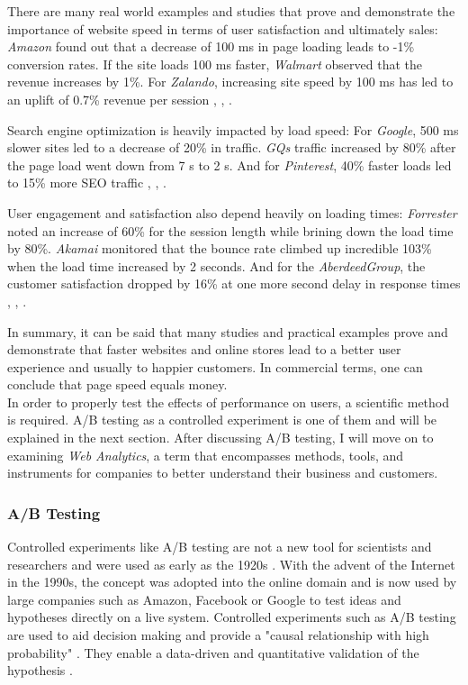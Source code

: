 There are many real world examples and studies that prove and demonstrate the importance of website speed in terms of user satisfaction and ultimately sales:
\textit{Amazon} found out that a decrease of 100 ms in page loading leads to -1\% conversion rates.
If the site loads 100 ms faster, \textit{Walmart} observed that the revenue increases by 1\%.
For \textit{Zalando}, increasing site speed by 100 ms has led to an uplift of 0.7\% revenue per session \cite{2006Linden}, \cite{2018Zalando}, \cite{2012Walmart}.


Search engine optimization is heavily impacted by load speed:
For \textit{Google}, 500 ms slower sites led to a decrease of 20\% in traffic.
\textit{GQs} traffic increased by 80\% after the page load went down from 7 s to 2 s.
And for \textit{Pinterest}, 40\% faster loads led to 15\% more SEO traffic \cite{2015GQ}, \cite{2006Mayer}, \cite{2017Pinterest}.


User engagement and satisfaction also depend heavily on loading times:
\textit{Forrester} noted an increase of 60\% for the session length while brining down the load time by 80\%.
\textit{Akamai} monitored that the bounce rate climbed up incredible 103\% when the load time increased by 2 seconds.
And for the \textit{AberdeedGroup}, the customer satisfaction dropped by 16\% at one more second delay in response times \cite{2017Forrester}, \cite{2017Akamai}, \cite{2008Aberdeen}.

In summary, it can be said that many studies and practical examples prove and demonstrate that faster websites and online stores lead to a better user experience and usually to happier customers.
In commercial terms, one can conclude that page speed equals money.
\\

In order to properly test the effects of performance on users, a scientific method is required.
A/B testing as a controlled experiment is one of them and will be explained in the next section.
After discussing A/B testing, I will move on to examining \textit{Web Analytics}, a term that encompasses methods, tools, and instruments for companies to better understand their business and customers.


\subsubsection{A/B Testing}

Controlled experiments like A/B testing are not a new tool for scientists and researchers and were used as early as the 1920s \cite{2016Kohavi}.
With the advent of the Internet in the 1990s, the concept was adopted into the online domain and is now used by large companies such as Amazon, Facebook or Google to test ideas and hypotheses directly on a live system.
Controlled experiments such as A/B testing are used to aid decision making and provide a "causal relationship with high probability" \cite{2016Kohavi}.
They enable a data-driven and quantitative validation of the hypothesis \cite{2018Morys}.

